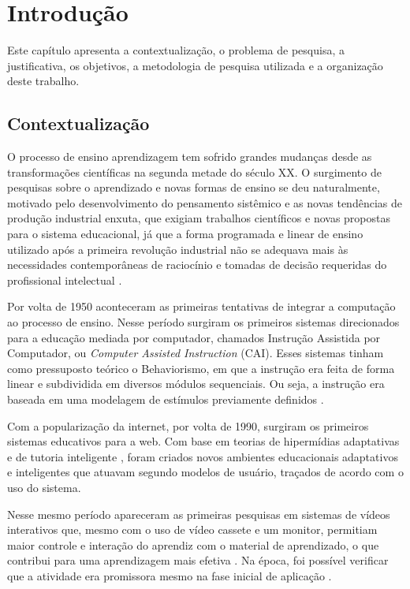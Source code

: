 \chapter*[Introdução]{Introdução}

Este capítulo apresenta a contextualização, o problema de pesquisa, a justificativa,
os objetivos, a metodologia de pesquisa utilizada e a organização deste trabalho.

\section*{Contextualização}

O processo de ensino aprendizagem tem sofrido grandes mudanças desde as transformações científicas na segunda metade do século XX. O surgimento de pesquisas sobre o aprendizado e novas formas de ensino se deu naturalmente, motivado pelo desenvolvimento do pensamento sistêmico e as novas tendências de produção industrial enxuta, que exigiam trabalhos científicos e novas propostas para o sistema educacional, já que a forma programada e linear de ensino utilizado após a primeira revolução industrial não se adequava mais às necessidades contemporâneas de raciocínio e tomadas de decisão requeridas do profissional intelectual \cite{oliveira2009, frigotto1989}.

Por volta de 1950 aconteceram as primeiras tentativas de integrar a computação ao processo de ensino. Nesse período surgiram os primeiros sistemas direcionados para a educação mediada por computador, chamados Instrução Assistida por Computador, ou \textit{Computer Assisted Instruction} (CAI). Esses sistemas tinham como pressuposto teórico o Behaviorismo, em que a instrução era feita de forma linear e subdividida em diversos módulos sequenciais. Ou seja, a instrução era baseada em uma modelagem de estímulos previamente definidos \cite{giraffa1995,vicari2003}.

Com a popularização da internet, por volta de 1990, surgiram os primeiros sistemas educativos para a web. Com base em teorias de hipermídias adaptativas \cite{brusilovsky1996} e de tutoria inteligente \cite{brusilovsky1994}, foram criados novos ambientes educacionais adaptativos e inteligentes que atuavam segundo modelos de usuário, traçados de acordo com o uso do sistema.

Nesse mesmo período apareceram as primeiras pesquisas em sistemas de vídeos interativos que, mesmo com o uso de vídeo cassete e um monitor, permitiam maior controle e interação do aprendiz com o material de aprendizado, o que contribui para uma aprendizagem mais efetiva \cite{zhang2005}. Na época, foi possível verificar que a atividade era promissora mesmo na fase inicial de aplicação \cite{gaudreau1984}.

